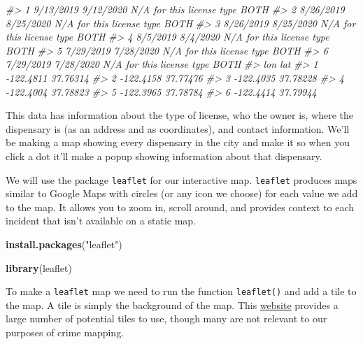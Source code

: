 \documentclass[
  12pt,
]{book}
\newenvironment{Shaded}{\begin{snugshade}}{\end{snugshade}}
\newcommand{\CommentTok}[1]{\textcolor[rgb]{0.37,0.37,0.37}{\textit{#1}}}
\newcommand{\KeywordTok}[1]{\textcolor[rgb]{0.27,0.27,0.27}{\textbf{#1}}}
\newcommand{\NormalTok}[1]{#1}
\newcommand{\StringTok}[1]{\textcolor[rgb]{0.5,0.5,0.5}{#1}}
\begin{document}
\begin{Shaded}
\begin{Highlighting}[]
\CommentTok{\#> 1  9/13/2019       9/12/2020 N/A for this license type                BOTH}
\CommentTok{\#> 2  8/26/2019       8/25/2020 N/A for this license type                BOTH}
\CommentTok{\#> 3  8/26/2019       8/25/2020 N/A for this license type                BOTH}
\CommentTok{\#> 4   8/5/2019        8/4/2020 N/A for this license type                BOTH}
\CommentTok{\#> 5  7/29/2019       7/28/2020 N/A for this license type                BOTH}
\CommentTok{\#> 6  7/29/2019       7/28/2020 N/A for this license type                BOTH}
\CommentTok{\#>         lon      lat}
\CommentTok{\#> 1 {-}122.4811 37.76314}
\CommentTok{\#> 2 {-}122.4158 37.77476}
\CommentTok{\#> 3 {-}122.4035 37.78228}
\CommentTok{\#> 4 {-}122.4004 37.78823}
\CommentTok{\#> 5 {-}122.3965 37.78784}
\CommentTok{\#> 6 {-}122.4414 37.79944}
\end{Highlighting}
\end{Shaded}

This data has information about the type of license, who the owner is, where the dispensary is (as an address and as coordinates), and contact information. We'll be making a map showing every dispensary in the city and make it so when you click a dot it'll make a popup showing information about that dispensary.

We will use the package \texttt{leaflet} for our interactive map. \texttt{leaflet} produces maps similar to Google Maps with circles (or any icon we choose) for each value we add to the map. It allows you to zoom in, scroll around, and provides context to each incident that isn't available on a static map.

\begin{Shaded}
\begin{Highlighting}[]
\KeywordTok{install.packages}\NormalTok{(}\StringTok{"leaflet"}\NormalTok{)}
\end{Highlighting}
\end{Shaded}

\begin{Shaded}
\begin{Highlighting}[]
\KeywordTok{library}\NormalTok{(leaflet)}
\end{Highlighting}
\end{Shaded}

To make a \texttt{leaflet} map we need to run the function \texttt{leaflet()} and add a tile to the map. A tile is simply the background of the map. This \href{https://leaflet-extras.github.io/leaflet-providers/preview/}{website} provides a large number of potential tiles to use, though many are not relevant to our purposes of crime mapping.
\end{document}
